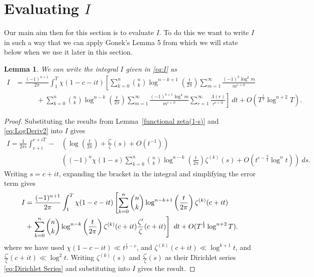 \documentclass[12pt,a4paper,reqno]{amsart}
\newtheorem{lemma}{Lemma}
\theoremstyle{remark}
\numberwithin{equation}{section}
\begin{document}
\section{Evaluating $I$}\label{sect:I}

Our main aim then for this section is to evaluate $I$. To do this we want to write $I$ in such a way that we can apply Gonek's Lemma 5 from \cite{Gonek} which we will state below when we use it later in this section.

\begin{lemma}
We can write the integral $I$ given in \eqref{eq:I} as
\begin{align*}
I &= \frac{(-1)^{n+1}}{2 \pi} \int_{1}^{T} \chi (1 - c - it) \left[ \sum_{k=0}^n \binom{n}{k} \log^{n-k+1} \left( \frac{t}{2 \pi} \right) \sum_{m=1}^{\infty} \frac{(-1)^k \log^k m}{m^{c + it}} \right. \\
&\qquad \quad +\left. \sum_{k=0}^n \binom{n}{k} \log^{n-k} \left( \frac{t}{2 \pi} \right) \sum_{m=1}^{\infty} \frac{(-1)^{k+1} \log^k m}{m^{c + it}} \sum_{r=1}^{\infty} \frac{\Lambda (r)}{r^{c+it}} \right] \ dt +O(T^{\frac{1}{2}} \log^{n+2} T).
\end{align*}
\end{lemma}

\begin{proof}
Substituting the results from Lemma~\ref{functional zeta(1-s)} and \eqref{eq:LogDeriv2} into $I$ gives
\begin{align*}
I = \frac{1}{2 \pi i} \int_{c+i}^{c+iT} - &\left( \log \left( \frac{t}{2 \pi} \right) + \frac{\zeta'}{\zeta}(s) + O(t^{-1})  \right) \\
&\left( (-1)^n \chi (1-s) \sum_{k=0}^n \binom{n}{k} \log^{n-k} \left(\frac{t}{2 \pi} \right) \zeta^{(k)} (s) + O(t^{c-\frac{3}{2}} \log^{n} t) \right) \ ds.
\end{align*}
Writing $s=c+it$, expanding the bracket in the integral and simplifying the error term gives
\begin{align}
I &= \frac{(-1)^{n+1}}{2 \pi} \int_{1}^{T} \chi (1 - c - it) \left[ \sum_{k=0}^n \binom{n}{k} \log^{n-k+1} \left( \frac{t}{2 \pi} \right) \zeta^{(k)}(c +it) \right. \notag\\
&+\left. \sum_{k=0}^n \binom{n}{k} \log^{n-k} \left( \frac{t}{2 \pi} \right) \zeta^{(k)}(c+it) \frac{\zeta '}{\zeta} (c +it) \right] \ dt + O(T^{\frac{1}{2}} \log ^{n+2} T). \label{eq:I split}
\end{align}
where we have used $\chi (1-c- it) \ll t^{\frac{1}{2} -c}$, and $\zeta^{(k)}(c+it) \ll \log^{k+1} t$, and $\frac{\zeta '}{\zeta} (c +it)  \ll \log^2 t$. Writing $\zeta^{(k)}(s)$ and $\frac{\zeta '}{\zeta} (s)$ as their Dirichlet series \eqref{eq:Dirichlet Series} and substituting into $I$ gives the result.
\end{proof}
\end{document}

